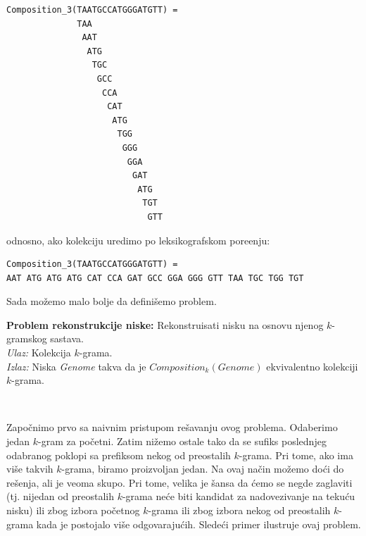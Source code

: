 \begin{lstlisting}
Composition_3(TAATGCCATGGGATGTT) =
              TAA 
               AAT 
                ATG
                 TGC
                  GCC
                   CCA
                    CAT
                     ATG
                      TGG
                       GGG
                        GGA
                         GAT
                          ATG
                           TGT
                            GTT
\end{lstlisting}

\noindent odnosno, ako kolekciju uredimo po leksikografskom pore\dj enju:

\begin{lstlisting}
Composition_3(TAATGCCATGGGATGTT) =
AAT ATG ATG ATG CAT CCA GAT GCC GGA GGG GTT TAA TGC TGG TGT
\end{lstlisting}

\noindent Sada možemo malo bolje da definišemo problem.

\begin{tcolorbox}
	\textbf{Problem rekonstrukcije niske:} Rekonstruisati nisku na osnovu njenog $k$-gramskog sastava. \\
	\textit{Ulaz:} Kolekcija $k$-grama.\\
	\textit{Izlaz:} Niska \emph{Genome} takva da je $Composition_k(Genome)$ ekvivalentno kolekciji $k$-grama.
\end{tcolorbox}
~

Zapo\v cnimo prvo sa naivnim pristupom re\v savanju ovog problema. Odaberimo jedan $k$-gram za početni. Zatim nižemo ostale tako da se sufiks poslednjeg odabranog poklopi sa prefiksom nekog od preostalih $k$-grama. Pri tome, ako ima više takvih $k$-grama, biramo proizvoljan jedan. Na ovaj način možemo doći do rešenja, ali je veoma skupo. Pri tome, velika je šansa da ćemo se negde zaglaviti (tj. nijedan od preostalih $k$-grama neće biti kandidat za nadovezivanje na tekuću nisku) ili zbog izbora početnog $k$-grama ili zbog izbora nekog od preostalih $k$-grama kada je postojalo više odgovarajućih. Sledeći primer ilustruje ovaj problem.

